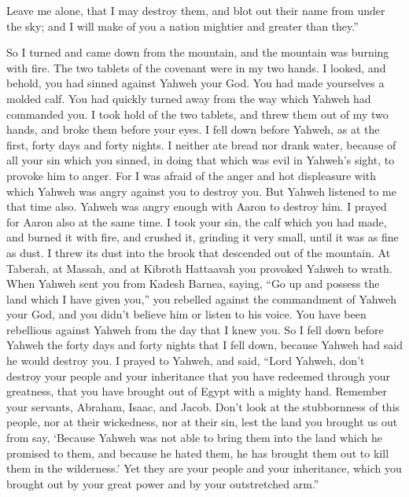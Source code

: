 {Leave me alone, that I may destroy them, and blot out their name from under the sky; and I will make of you a nation mightier and greater than they.”
\par }{\PP {}So I turned and came down from the mountain, and the mountain was burning with fire. The two tablets of the covenant were in my two hands.
I looked, and behold, you had sinned against Yahweh your God. You had made yourselves a molded calf. You had quickly turned away from the way which Yahweh had commanded you.
I took hold of the two tablets, and threw them out of my two hands, and broke them before your eyes.
I fell down before Yahweh, as at the first, forty days and forty nights. I neither ate bread nor drank water, because of all your sin which you sinned, in doing that which was evil in Yahweh’s sight, to provoke him to anger.
For I was afraid of the anger and hot displeasure with which Yahweh was angry against you to destroy you. But Yahweh listened to me that time also.
Yahweh was angry enough with Aaron to destroy him. I prayed for Aaron also at the same time.
I took your sin, the calf which you had made, and burned it with fire, and crushed it, grinding it very small, until it was as fine as dust. I threw its dust into the brook that descended out of the mountain.
At Taberah, at Massah, and at Kibroth Hattaavah you provoked Yahweh to wrath.
When Yahweh sent you from Kadesh Barnea, saying, “Go up and possess the land which I have given you,” you rebelled against the commandment of Yahweh your God, and you didn’t believe him or listen to his voice.
You have been rebellious against Yahweh from the day that I knew you.
So I fell down before Yahweh the forty days and forty nights that I fell down, because Yahweh had said he would destroy you.
I prayed to Yahweh, and said, “Lord Yahweh, don’t destroy your people and your inheritance that you have redeemed through your greatness, that you have brought out of Egypt with a mighty hand.
Remember your servants, Abraham, Isaac, and Jacob. Don’t look at the stubbornness of this people, nor at their wickedness, nor at their sin,
lest the land you brought us out from say, ‘Because Yahweh was not able to bring them into the land which he promised to them, and because he hated them, he has brought them out to kill them in the wilderness.’
Yet they are your people and your inheritance, which you brought out by your great power and by your outstretched arm.”

}
